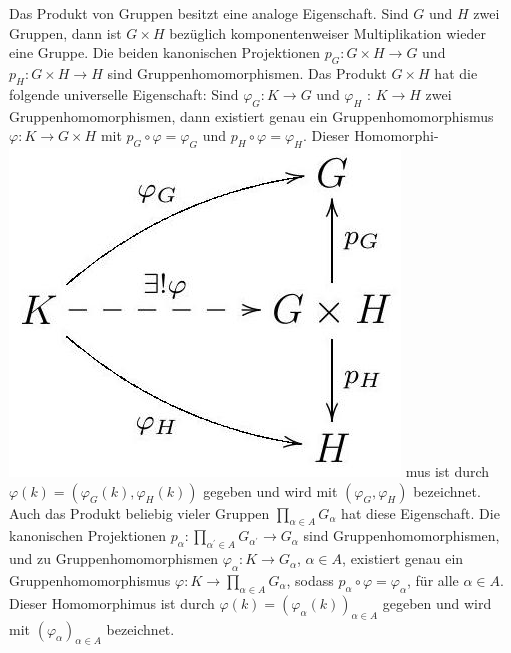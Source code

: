 \documentclass[10pt]{article}
\begin{document}
Das Produkt von Gruppen besitzt eine analoge Eigenschaft. Sind $G$ und $H$ zwei Gruppen, dann ist $G \times H$ bezüglich komponentenweiser Multiplikation wieder eine Gruppe. Die beiden kanonischen Projektionen $p_{G}: G \times H \rightarrow G$ und $p_{H}: G \times H \rightarrow H$ sind Gruppenhomomorphismen. Das Produkt $G \times H$ hat die folgende universelle Eigenschaft: Sind $\varphi_{G}: K \rightarrow G$ und $\varphi_{H}$ : $K \rightarrow H$ zwei Gruppenhomomorphismen, dann existiert genau ein Gruppenhomomorphismus $\varphi: K \rightarrow G \times H$ mit $p_{G} \circ \varphi=\varphi_{G}$ und $p_{H} \circ \varphi=\varphi_{H}$. Dieser Homomorphi-\\
\includegraphics[max width=\textwidth]{2025_06_05_d7ed2bacd1e9ce1db1f0g-010} mus ist durch $\varphi(k)=\left(\varphi_{G}(k), \varphi_{H}(k)\right)$ gegeben und wird mit $\left(\varphi_{G}, \varphi_{H}\right)$ bezeichnet. Auch das Produkt beliebig vieler Gruppen $\prod_{\alpha \in A} G_{\alpha}$ hat diese Eigenschaft. Die kanonischen Projektionen $p_{\alpha}: \prod_{\alpha^{\prime} \in A} G_{\alpha^{\prime}} \rightarrow G_{\alpha}$ sind Gruppenhomomorphismen, und zu Gruppenhomomorphismen $\varphi_{\alpha}: K \rightarrow G_{\alpha}$, $\alpha \in A$, existiert genau ein Gruppenhomomorphismus $\varphi: K \rightarrow \prod_{\alpha \in A} G_{\alpha}$, sodass $p_{\alpha} \circ \varphi=\varphi_{\alpha}$, für alle $\alpha \in A$. Dieser Homomorphimus ist durch $\varphi(k)=\left(\varphi_{\alpha}(k)\right)_{\alpha \in A}$ gegeben und wird mit $\left(\varphi_{\alpha}\right)_{\alpha \in A}$ bezeichnet.
\end{document}
